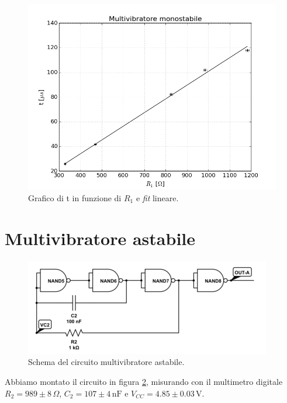 \documentclass[10pt,a4paper]{article}
\begin{document}
\begin{figure}[!htb]
  \centering
  \includegraphics[scale=0.7]{fitmonostabile.png}
\caption{Grafico di t in funzione di $R_1$ e \emph{fit} lineare.\label{fit:monostabile}}
\end{figure}


\section{Multivibratore astabile}
\begin{figure}[!htb]
  \centering
  \includegraphics[scale=0.8]{astabile.png}
\caption{Schema del circuito multivibratore astabile.\label{fig:astabile}}
\end{figure}

Abbiamo montato il circuito in figura \ref{fig:astabile}, misurando con il multimetro digitale $R_2= 989\pm8\,\Omega$, $C_2= 107\pm4 \,\text{nF} $ e $V_{CC}= 4.85\pm0.03\,\text{V}$.
\end{document}
